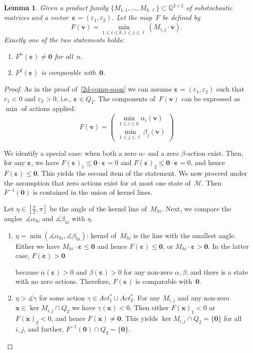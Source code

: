 \documentclass[preprint,12pt]{elsarticle}
\theoremstyle{plain}
\newtheorem{lemma}[theorem]{Lemma}
\theoremstyle{definition}
\theoremstyle{remark}
\theoremstyle{claimstyle}
\newcommand{\mdp}{\mathcal{M}}
\newcommand{\QQ}{\mathbb{Q}}
\newcommand{\eps}{\bm{\varepsilon}}
\begin{document}
\begin{lemma}\label{2d-comp-soon-min}
	Given a product family $\{M_{1,1}, \dots, M_{k,\ell}\} \subset \QQ^{2\times 2}$ of substochastic matrices
	and a vector~$\eps = (\varepsilon_1, \varepsilon_2)$. 
	Let the map~$F$ be defined by
	\[F(\bm{v}) = \min_{1\leq i \leq k, 1\leq j \leq \ell} \left(M_{i,j} \cdot\bm{v}\right).\]
	Exactly one of the two statements holds:
	\begin{enumerate}
		\item $F^n(\eps) \neq \bm{0}$ for all~$n$.
		\item $F^2(\eps)$ is comparable with~$\bm{0}$.
	\end{enumerate}
\end{lemma}
\begin{proof}
	As in the proof of~\cref{2d-comp-soon} we can assume $\eps = (\varepsilon_1, \varepsilon_2)$ such that $\varepsilon_1 < 0$ and $\varepsilon_2 > 0$, i.e., $\eps \in Q_2$.
	The components of~$F(\bm{v})$ can be expressed as $\min$ of actions applied:
	\begin{equation}\label{each-act-min}
		F(\bm{v}) = 
		\begin{pmatrix} \min_{1\leq i \leq k}  \alpha_i(\bm{v}) \\ \min_{1\leq j \leq \ell}  \beta_j(\bm{v})
		\end{pmatrix}
	\end{equation}
	
	We identify a special case: when both a zero $\alpha$- and a zero $\beta$-action exist.
	Then, for any $\eps$, we have $F(\eps)_1 \leq \bm{0}\cdot\eps = 0$ and $F(\eps)_2 \leq \bm{0}\cdot\eps = 0$, and hence $F(\eps) \leq \bm{0}$. 
	This yields the second item of the statement. 
	We now proceed under the assumption that zero actions exist for at most one state of~$\mdp$.
	Then $F^{-1}(\bm{0})$ is contained in the union of kernel lines.
	
	Let $\eta \in [\frac{\pi}{2}, \pi]$ be the angle of the kernel line of~$M_{hi}$.
	Next, we compare the angles~$\measuredangle \alpha_{hi}$ and $\measuredangle\beta_{hi}$ with $\eta$.
	\begin{enumerate}
		\item $\eta = \min(\measuredangle \alpha_{hi}, \measuredangle \beta_{hi})$: kernel of~$M_{hi}$ is the line with the smallest angle.
		 Either we have 
		 $M_{hi}\cdot\eps \leq \bm{0}$ and hence $F(\eps) \leq \bm{0}$, or $M_{hi} \cdot\eps > \bm{0}$. 
		 In the latter case, $F(\eps) > \bm{0}$ 

		 because $\alpha(\eps) > 0$ and $\beta(\eps) > 0$ for any non-zero $\alpha,\beta$; 
		 and there is a state with no zero actions.
		 Therefore, $F(\eps)$ is comparable with~$\bm{0}$.
		\item $\eta > \measuredangle \gamma$ for some action $\gamma \in Act^*_1 \cup Act^*_2$. 
		For any $M_{i,j}$ and any non-zero $\bm{x} \in \ker M_{i,j} \cap Q_2$ we have $\gamma(\bm{x}) < 0$. 
		Then either $F(\bm{x})_1 < 0$ or $F(\bm{x})_2 < 0$, and hence $F(\bm{x}) \neq \bm{0}$. 
		This yields $\ker M_{i,j} \cap Q_2 = \{\bm{0}\}$ for all~$i,j$,
		and further, $F^{-1}(\bm{0}) \cap Q_2 = \{\bm{0}\}$. 
		

\end{enumerate}
\end{proof}
\end{document}
